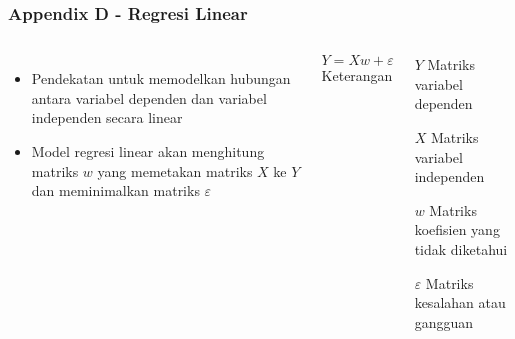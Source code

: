 \documentclass[8pt]{beamer}
\begin{document}
\begin{frame}
  \frametitle{Appendix D - Regresi Linear}
  \begin{columns}[T]
    \begin{itemize}
      \item Pendekatan untuk memodelkan hubungan antara variabel dependen dan variabel independen secara linear
      \item Model regresi linear akan menghitung matriks $w$ yang memetakan matriks $X$ ke $Y$ dan meminimalkan matriks $\varepsilon$ 
    \end{itemize}
    \begin{equation}
      \label{eq:reglinear}
      Y = Xw + \varepsilon
    \end{equation}
    \center Keterangan
    \begin{description}
      \item{$Y$} Matriks variabel dependen
      \item{$X$} Matriks variabel independen
      \item{$w$} Matriks koefisien yang tidak diketahui
      \item{$\varepsilon$} Matriks kesalahan atau gangguan
    \end{description}
  \end{columns}
\end{frame}
\end{document}
